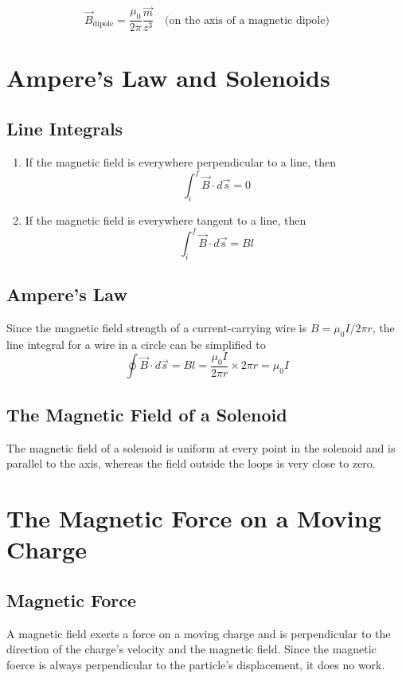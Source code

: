 \documentclass{article}
\begin{document}
\[\vec{B}_\text{dipole}=\frac{\mu_0}{2\pi}\frac{\vec{m}}{z^3}\quad
\text{(on the axis of a magnetic dipole)}\]

\pagebreak

\section*{Ampere's Law and Solenoids}
\subsection*{Line Integrals}
\begin{enumerate}
    \item If the magnetic field is everywhere perpendicular to a line, then \[\int_i^f\vec{B}
    \cdot d\vec{s}=0\]
    \item If the magnetic field is everywhere tangent to a line, then \[\int_i^f\vec{B}\cdot d
    \vec{s}=Bl\]
\end{enumerate}

\subsection*{Ampere's Law}
Since the magnetic field strength of a current-carrying wire is $B=\mu_0 I / 2\pi r$, the line
integral for a wire in a circle can be simplified to
\[\oint \vec{B}\cdot d \vec{s} = Bl = \frac{\mu_0 I}{2\pi r}\times 2\pi r=\mu_0 I\]

\subsection*{The Magnetic Field of a Solenoid}
The magnetic field of a solenoid is uniform at every point in the solenoid and is parallel to the
axis, whereas the field outside the loops is very close to zero.

\pagebreak
\section*{The Magnetic Force on a Moving Charge}
\subsection*{Magnetic Force}
A magnetic field exerts a force on a moving charge and is perpendicular to the direction of the
charge's velocity and the magnetic field. Since the magnetic foerce is always perpendicular to the
particle's displacement, it does no work.
\end{document}
